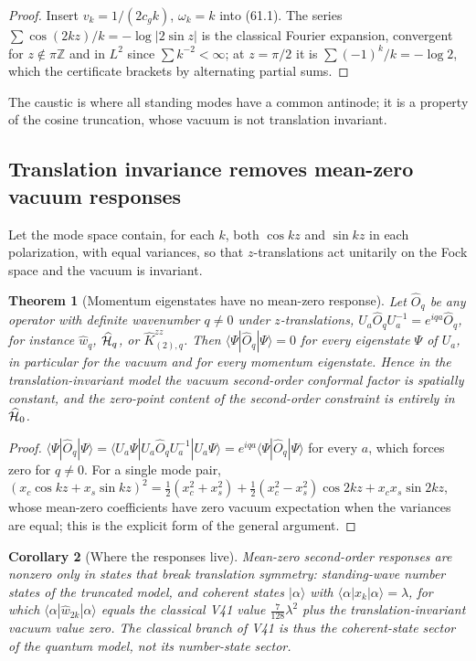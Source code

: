 \documentclass[11pt]{article}
\newtheorem{theorem}{Theorem}[section]
\newtheorem{corollary}[theorem]{Corollary}
\theoremstyle{remark}
\begin{document}
\begin{proof}
Insert \(v_k=1/(2c_gk)\), \(\omega_k=k\) into (61.1).  The series
\(\sum\cos(2kz)/k=-\log|2\sin z|\) is the classical Fourier expansion,
convergent for \(z\notin\pi\mathbb Z\) and in \(L^2\) since
\(\sum k^{-2}<\infty\); at \(z=\pi/2\) it is
\(\sum(-1)^k/k=-\log2\), which the certificate brackets by alternating
partial sums.
\end{proof}

The caustic is where all standing modes have a common antinode; it is
a property of the cosine truncation, whose vacuum is not translation
invariant.

\subsection{Translation invariance removes mean-zero vacuum responses}

Let the mode space contain, for each \(k\), both \(\cos kz\) and
\(\sin kz\) in each polarization, with equal variances, so that
\(z\)-translations act unitarily on the Fock space and the vacuum is
invariant.

\begin{theorem}[Momentum eigenstates have no mean-zero response]
\label{thm:v19v59-invariance}
Let \(\hat O_q\) be any operator with definite wavenumber \(q\neq0\)
under \(z\)-translations, \(U_a\hat O_qU_a^{-1}=e^{iqa}\hat O_q\), for
instance \(\hat w_q\), \(\widehat{\cal H}_q\), or \(\widehat K^{zz}_{(2),q}\).
Then \(\langle\Psi|\hat O_q|\Psi\rangle=0\) for every eigenstate
\(\Psi\) of \(U_a\), in particular for the vacuum and for every
momentum eigenstate.  Hence in the translation-invariant model the
vacuum second-order conformal factor is spatially constant, and the
zero-point content of the second-order constraint is entirely in
\(\widehat{\cal H}_0\).
\end{theorem}

\begin{proof}
\(\langle\Psi|\hat O_q|\Psi\rangle=\langle U_a\Psi|U_a\hat O_qU_a^{-1}|U_a\Psi\rangle
=e^{iqa}\langle\Psi|\hat O_q|\Psi\rangle\) for every \(a\), which forces
zero for \(q\neq0\).  For a single mode pair,
\((x_c\cos kz+x_s\sin kz)^2=\tfrac12(x_c^2+x_s^2)+\tfrac12(x_c^2-x_s^2)\cos2kz+x_cx_s\sin2kz\),
whose mean-zero coefficients have zero vacuum expectation when the
variances are equal; this is the explicit form of the general
argument.
\end{proof}

\begin{corollary}[Where the responses live]
\label{cor:v19v59-where}
Mean-zero second-order responses are nonzero only in states that break
translation symmetry: standing-wave number states of the truncated
model, and coherent states \(|\alpha\rangle\) with
\(\langle\alpha|x_k|\alpha\rangle=\lambda\), for which
\(\langle\alpha|\hat w_{2k}|\alpha\rangle\) equals the classical V41
value \(\tfrac7{128}\lambda^2\) plus the translation-invariant vacuum
value zero.  The classical branch of V41 is thus the coherent-state
sector of the quantum model, not its number-state sector.
\end{corollary}
\end{document}
